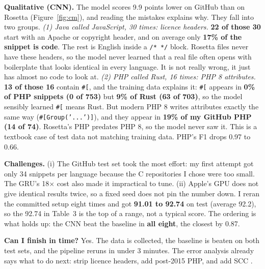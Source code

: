 \documentclass{article}
\begin{document}
\textbf{Qualitative (CNN).} The model scores 9.9 points lower on GitHub than on Rosetta
(Figure~\ref{fig:cm}), and reading the mistakes explains why. They fall into two groups.
\emph{(1) Java called JavaScript, 30 times: licence headers.} \textbf{22 of those 30} start with an
Apache or copyright header, and on average only \textbf{17\% of the snippet is code}. The rest is English inside a
\texttt{/*~*/} block. Rosetta files never have these headers, so the model never learned that a real
file often opens with boilerplate that looks identical in every language. It is not really wrong, it
just has almost no code to look at. \emph{(2) PHP called Rust, 16 times: PHP 8 attributes.} \textbf{13 of those 16} contain
\texttt{\#[}, and the training data explains it: \texttt{\#[} appears in \textbf{0\% of PHP snippets
(0 of 753)} but \textbf{9\% of Rust (63 of 703)}, so the model sensibly learned \texttt{\#[} means
Rust. But modern PHP 8 writes attributes exactly the same way (\texttt{\#[Group('...')]}), and they
appear in \textbf{19\% of my GitHub PHP (14 of 74)}. Rosetta's PHP predates PHP 8, so the model never
saw it. This is a textbook case of test data not matching training data. PHP's F1 drops 0.97 to 0.66.

\textbf{Challenges.} (i) The GitHub test set took the most effort: my first attempt got only 34
snippets per language because the C repositories I chose were too small. The GRU's 18$\times$ cost
also made it impractical to tune. (ii) Apple's GPU does not give identical results twice, so a fixed
seed does not pin the number down. I reran the committed setup eight times and got \textbf{91.01 to
92.74} on test (average 92.2), so the 92.74 in Table~3 is the top of a range, not a typical score.
The ordering is what holds up: the CNN beat the baseline in \textbf{all eight}, the closest by 0.87.

\textbf{Can I finish in time?}\label{sec:feas} Yes. The data is collected, the baseline is beaten on
both test sets, and the pipeline reruns in under 3 minutes. The error analysis already says what to
do next: strip licence headers, add post-2015 PHP, and add SCC \citep{alreshedy2018scc}.



\end{document}
